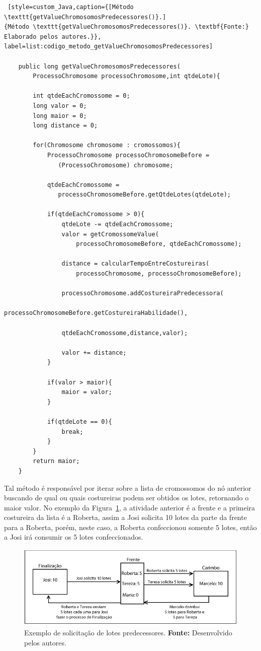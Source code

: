 \begin{lstlisting} [style=custom_Java,caption={[Método \texttt{getValueChromosomosPredecessores()}.]
{Método \texttt{getValueChromosomosPredecessores()}. \textbf{Fonte:} Elaborado pelos autores.}}, label=list:codigo_metodo_getValueChromosomosPredecessores] 	

	public long getValueChromosomosPredecessores(
		ProcessoChromosome processoChromosome,int qtdeLote){
	
		int qtdeEachCromossome = 0;
		long valor = 0;
		long maior = 0;
		long distance = 0;
		
		for(Chromosome chromosome : cromossomos){
			ProcessoChromosome processoChromosomeBefore =
			   (ProcessoChromosome) chromosome;
			
			qtdeEachCromossome =
			   processoChromosomeBefore.getQtdeLotes(qtdeLote);
			
			if(qtdeEachCromossome > 0){
				qtdeLote -= qtdeEachCromossome;
				valor = getCromossomeValue(
					processoChromosomeBefore, qtdeEachCromossome);
					
				distance = calcularTempoEntreCostureiras(
					processoChromosome, processoChromosomeBefore);
				
				processoChromosome.addCostureiraPredecessora(
					processoChromosomeBefore.getCostureiraHabilidade(), 
					
				qtdeEachCromossome,distance,valor);
				
				valor += distance;
			}
			
			if(valor > maior){
				maior = valor;
			}
			
			if(qtdeLote == 0){
				break;
			}
		}
		return maior;
	}	
\end{lstlisting}

\par Tal método é responsável por iterar sobre a lista de cromossomos do nó anterior buscando de qual ou quais costureiras 
podem ser obtidos os lotes, retornando o maior valor. No exemplo da Figura~\ref{fig:ex_solicitaca_lotes}, a atividade anterior 
é a frente e a primeira costureira da lista é a Roberta, assim a Josi solicita 10 lotes da parte da frente para a Roberta, porém, 
neste caso, a Roberta confeccionou somente 5 lotes, então a Josi irá consumir os 5 lotes confeccionados.

\newpage

\begin{figure}[h!]
	\centerline{\includegraphics[scale=1.2]{./imagens/distribuicao_exemplo_apresentacao.png}}
	\caption[Exemplo de solicitação de lotes predecessores.]
	{Exemplo de solicitação de lotes predecessores.
	\textbf{Fonte:} Desenvolvido pelos autores.}
	\label{fig:ex_solicitaca_lotes}
\end{figure}


